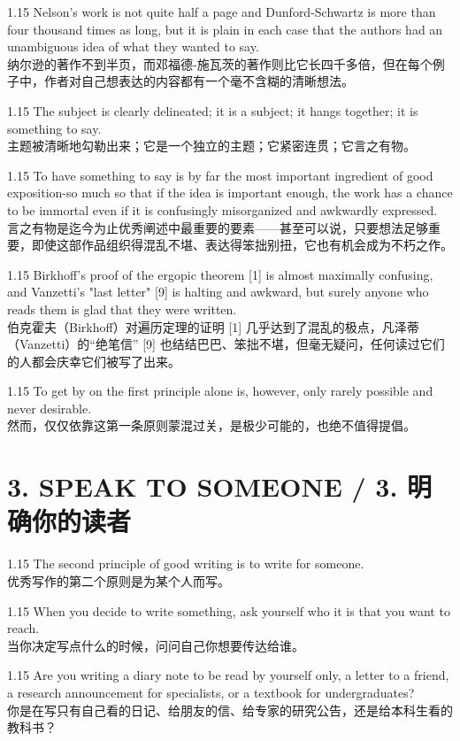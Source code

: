 \documentclass[12pt,a4paper]{article}
\newcommand{\bilingual}[2]{
    \begin{spacing}{1.15} %
        \noindent \normalsize #1 \\[-0.5ex] %
        \small \textcolor{blue!70!black}{#2} %
    \end{spacing}
    \vspace{0.8em} %
}
\begin{document}
\bilingual{Nelson's work is not quite half a page and Dunford-Schwartz is more than four thousand times as long, but it is plain in each case that the authors had an unambiguous idea of what they wanted to say.}
{纳尔逊的著作不到半页，而邓福德-施瓦茨的著作则比它长四千多倍，但在每个例子中，作者对自己想表达的内容都有一个毫不含糊的清晰想法。} %

\bilingual{The subject is clearly delineated; it is a subject; it hangs together; it is something to say.}
{主题被清晰地勾勒出来；它是一个独立的主题；它紧密连贯；它言之有物。} %

\bilingual{To have something to say is by far the most important ingredient of good exposition-so much so that if the idea is important enough, the work has a chance to be immortal even if it is confusingly misorganized and awkwardly expressed.}
{言之有物是迄今为止优秀阐述中最重要的要素——甚至可以说，只要想法足够重要，即使这部作品组织得混乱不堪、表达得笨拙别扭，它也有机会成为不朽之作。} %

\bilingual{Birkhoff's proof of the ergopic theorem [1] is almost maximally confusing, and Vanzetti's "last letter" [9] is halting and awkward, but surely anyone who reads them is glad that they were written.}
{伯克霍夫（Birkhoff）对遍历定理的证明 [1] 几乎达到了混乱的极点，凡泽蒂（Vanzetti）的“绝笔信” [9] 也结结巴巴、笨拙不堪，但毫无疑问，任何读过它们的人都会庆幸它们被写了出来。} %

\bilingual{To get by on the first principle alone is, however, only rarely possible and never desirable.}
{然而，仅仅依靠这第一条原则蒙混过关，是极少可能的，也绝不值得提倡。} %



\section*{3. SPEAK TO SOMEONE / 3. 明确你的读者} %

\bilingual{The second principle of good writing is to write for someone.}
{优秀写作的第二个原则是为某个人而写。} %

\bilingual{When you decide to write something, ask yourself who it is that you want to reach.}
{当你决定写点什么的时候，问问自己你想要传达给谁。} %

\bilingual{Are you writing a diary note to be read by yourself only, a letter to a friend, a research announcement for specialists, or a textbook for undergraduates?}
{你是在写只有自己看的日记、给朋友的信、给专家的研究公告，还是给本科生看的教科书？} %
\end{document}
